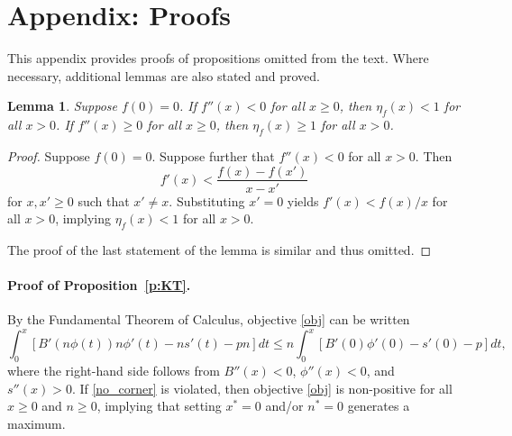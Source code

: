 \documentclass[12pt]{article}
\newcommand{\efficacy}{\phi}
\newcommand{\side}{s}
\newcommand{\benefit}{B}
\newcommand{\elasticity}[1]{\eta_{#1}}
\newtheorem{lemma}{Lemma}
\begin{document}

\clearpage
\setcounter{equation}{0}
\renewcommand{\theequation}{A\arabic{equation}}

\section*{Appendix: Proofs}

This appendix provides proofs of propositions omitted from the text. Where necessary, additional lemmas are also stated and proved.


\begin{lemma}
\label{l:elasticities}
Suppose $f(0) = 0$. If $f''(x) < 0$ for all $x \geq 0$, then $\elasticity{f}(x) < 1$ for all $x > 0$. If $f''(x) \geq 0$ for all $x \geq 0$, then $\elasticity{f}(x) \geq 1$ for all $x > 0$.
\end{lemma}

\begin{proof}
Suppose $f(0) = 0$. Suppose further that $f''(x) < 0$ for all $x > 0$. Then 
\begin{equation}
\label{a:concave}
f'(x) < \frac{f(x) - f(x')}{x - x'}
\end{equation}
for $x, x' \geq 0$ such that $x' \neq x$. Substituting $x' = 0$ yields $f'(x) < f(x)/x$ for all $x > 0$, implying $\elasticity{f}(x) < 1$ for all $x > 0$. 

The proof of the last statement of the lemma is similar and thus omitted.
\end{proof}


\paragraph{Proof of Proposition~\ref{p:KT}.}

By the Fundamental Theorem of Calculus, objective \eqref{obj} can be written
\begin{equation}
\label{a:ftc}
\int_0^x \left[ \benefit'(n\efficacy(t))n \efficacy'(t) - n \side'(t) - pn \right] dt \leq n \int_0^x \left[ \benefit'(0) \efficacy'(0) - \side'(0) - p \right] dt,
\end{equation} 
where the right-hand side follows from $\benefit''(x) < 0$, $\efficacy''(x) < 0$, and $\side''(x) > 0$. If \eqref{no_corner} is violated, then objective \eqref{obj} is non-positive for all $x \geq 0$ and $n \geq 0$, implying that setting $x^* = 0$ and/or $n^* = 0$ generates a maximum. 
\end{document}
